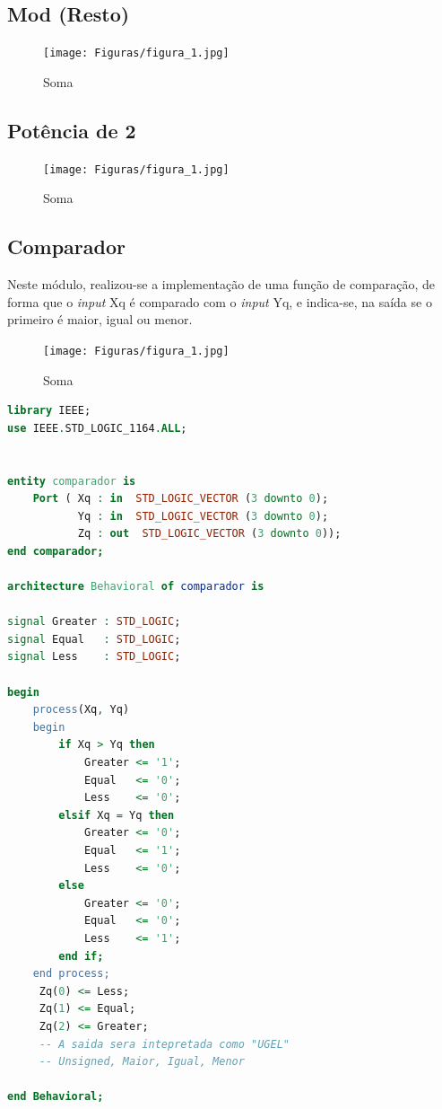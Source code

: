 \documentclass[a4paper, 12pt]{article}
\begin{document}
\subsection{Mod (Resto)}

\begin{figure}[H]
\caption{Soma}

\centering
\texttt{[image: Figuras/figura\_1.jpg]}
\label{figura:qualquernome}
\end{figure}

\subsection{Potência de 2}

\begin{figure}[H]
\caption{Soma}

\centering
\texttt{[image: Figuras/figura\_1.jpg]}
\label{figura:qualquernome}
\end{figure}

\subsection{Comparador}
Neste módulo, realizou-se a implementação de uma função de comparação, de forma que o \textit{input} Xq é comparado com o \textit{input} Yq, e indica-se, na saída se o primeiro é maior, igual ou menor.

\begin{figure}[H]
\caption{Soma}
\centering
\texttt{[image: Figuras/figura\_1.jpg]}
\label{figura:qualquernome}
\end{figure}

\begin{lstlisting}[language=VHDL]
library IEEE;
use IEEE.STD_LOGIC_1164.ALL;


entity comparador is
    Port ( Xq : in  STD_LOGIC_VECTOR (3 downto 0);
           Yq : in  STD_LOGIC_VECTOR (3 downto 0);
           Zq : out  STD_LOGIC_VECTOR (3 downto 0));
end comparador;

architecture Behavioral of comparador is

signal Greater : STD_LOGIC;
signal Equal   : STD_LOGIC;
signal Less    : STD_LOGIC;

begin
    process(Xq, Yq)
    begin
        if Xq > Yq then
            Greater <= '1';
            Equal   <= '0';
            Less    <= '0';
        elsif Xq = Yq then
            Greater <= '0';
            Equal   <= '1';
            Less    <= '0';
        else
            Greater <= '0';
            Equal   <= '0';
            Less    <= '1';
        end if;
    end process;
	 Zq(0) <= Less;
	 Zq(1) <= Equal;
	 Zq(2) <= Greater;
	 -- A saida sera intepretada como "UGEL"
	 -- Unsigned, Maior, Igual, Menor

end Behavioral;
\end{lstlisting}
\end{document}
